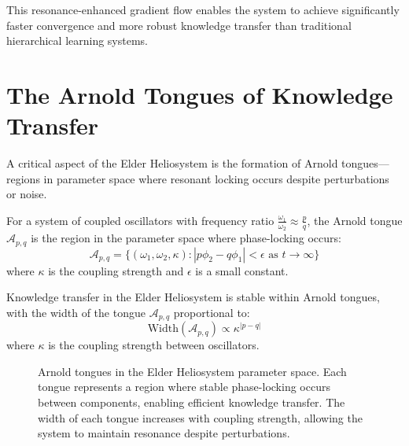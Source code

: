This resonance-enhanced gradient flow enables the system to achieve significantly faster convergence and more robust knowledge transfer than traditional hierarchical learning systems.

\section{The Arnold Tongues of Knowledge Transfer}

A critical aspect of the Elder Heliosystem is the formation of Arnold tongues—regions in parameter space where resonant locking occurs despite perturbations or noise.

\begin{definition}
For a system of coupled oscillators with frequency ratio $\frac{\omega_1}{\omega_2} \approx \frac{p}{q}$, the Arnold tongue $\mathcal{A}_{p,q}$ is the region in the parameter space where phase-locking occurs:
\begin{equation}
\mathcal{A}_{p,q} = \{(\omega_1, \omega_2, \kappa) : |p\phi_2 - q\phi_1| < \epsilon \text{ as } t \rightarrow \infty\}
\end{equation}
where $\kappa$ is the coupling strength and $\epsilon$ is a small constant.
\end{definition}

\begin{theorem}
Knowledge transfer in the Elder Heliosystem is stable within Arnold tongues, with the width of the tongue $\mathcal{A}_{p,q}$ proportional to:
\begin{equation}
\text{Width}(\mathcal{A}_{p,q}) \propto \kappa^{|p-q|}
\end{equation}
where $\kappa$ is the coupling strength between oscillators.
\end{theorem}

\begin{figure}[h]
\centering
{}
\caption{Arnold tongues in the Elder Heliosystem parameter space. Each tongue represents a region where stable phase-locking occurs between components, enabling efficient knowledge transfer. The width of each tongue increases with coupling strength, allowing the system to maintain resonance despite perturbations.}
\label{fig:arnold_tongues}
\end{figure}

